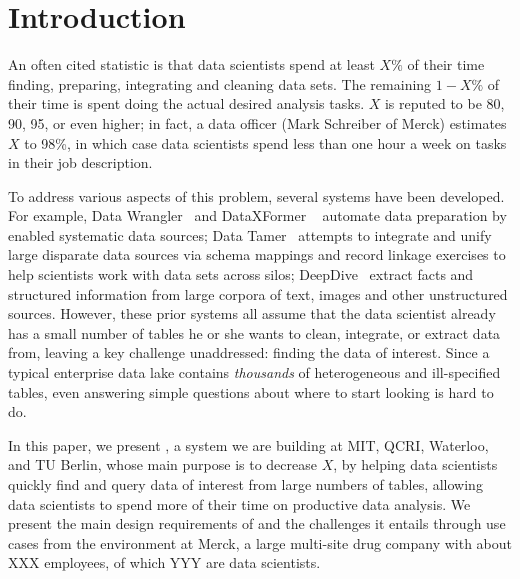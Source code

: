 \section{Introduction}
\label{introduction}

An often cited statistic is that data scientists spend at least
$X\%$ of their time finding, preparing, integrating and cleaning data sets.
The remaining $1-X\%$ of their time is spent doing the actual desired analysis
tasks.  $X$ is reputed to be 80, 90, 95, or even higher;  in fact,  
a data officer (Mark Schreiber
of Merck) estimates $X$ to 98\%, in which case data
scientists spend less than one hour a week on tasks in their job description.


To address various aspects of this problem, several systems have been developed.  For example, 
  Data Wrangler~\cite{2011-wrangler} and DataXFormer ~\cite{DBLP:conf/icde/AbedjanMIOPS16} automate data preparation by enabled systematic data sources; 
Data Tamer~\cite{DBLP:conf/cidr/StonebrakerBIBCZPX13} attempts to integrate and unify large disparate data sources via schema mappings and record linkage exercises to help scientists work with data sets across silos; 
DeepDive~\cite{DBLP:journals/pvldb/ShinWWSZR15} extract facts and structured information from large corpora of text, images and other unstructured sources.
However, these prior systems all assume that the
data scientist already has a small number of tables he or she wants to clean, integrate, or extract data from, leaving a key challenge unaddressed: finding the data of interest.  Since a typical enterprise data lake contains {\it thousands} of heterogeneous and ill-specified tables, even answering simple questions about where to start looking is hard to do.  

In this paper, we present 
\dcv, a system we are building
at MIT, QCRI, Waterloo, and TU Berlin, whose main purpose  is to decrease $X$, by helping data scientists quickly find and query data of interest from large numbers of tables, allowing 
data scientists to spend more of their time on productive data analysis.  We present the main  design requirements of \dcv and the challenges it entails through use cases from the environment at Merck,  a large multi-site drug company with about XXX employees, of which YYY are data scientists.


